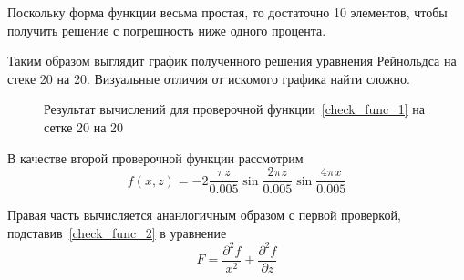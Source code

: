 \documentclass[a4paper,14pt]{extarticle}
\begin{document}
\noindent Поскольку форма функции весьма простая, то достаточно 10 элементов, чтобы получить решение с погрешность ниже одного процента.

\newpage
Таким образом выглядит график полученного решения уравнения Рейнольдса на стеке 20 на 20. Визуальные отличия от искомого графика найти сложно.
\begin{figure}[!htbp]
	\caption{Результат вычислений для проверочной функции~\eqref{check_func_1} на сетке 20 на 20}
	\label{res_check_func_1}
\end{figure}


В качестве второй проверочной функции рассмотрим
\begin{equation}
	f(x, z) = -2 \frac{\pi z}{0.005} \sin{\frac{2 \pi z}{0.005}} \sin{\frac{4 \pi x}{0.005}}
	\label{check_func_2}
\end{equation}

Правая часть вычисляется ананлогичным образом с первой проверкой, подставив~\eqref{check_func_2} в уравнение
\begin{equation*}
	F = \frac{\partial^2 f}{x^2} + \frac{\partial^2 f}{\partial z}
\end{equation*} 
\end{document}
